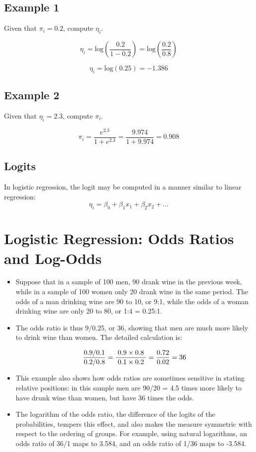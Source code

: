 \documentclass[12pt, a4paper]{article}
\theoremstyle{plain}
\theoremstyle{definition}
\theoremstyle{remark}
\begin{document}
\subsection*{Example 1}
Given that $\pi_i = 0.2$, compute $\eta_i$.

\[ \eta_i = \mbox{log}\left( \frac{0.2}{1-0.2} \right)= \mbox{log}\left( \frac{0.2}{0.8} \right)\] 

\[ \eta_i =  \mbox{log}(0.25) =-1.386 \]

\subsection*{Example 2}
Given that $\eta_i = 2.3$, compute $\pi_i$.

\[ \pi_i  =  \frac{e^{2.3}}{1 + e^{2.3}} = \frac{9.974}{1 + 9.974} = 0.908 \]


\subsection*{Logits}
In logistic regression, the logit may be computed in a manner similar to linear regression:
\[ \eta_i = \beta_0 + \beta_1x_1 + \beta_2x_2 + \ldots  \]


\section{Logistic Regression: Odds Ratios and Log-Odds}
\begin{itemize}
	\item Suppose that in a sample of 100 men, 90 drank wine in the previous week, while in a sample of 100 women only 20 drank wine in the same period. The odds of a man drinking wine are 90 to 10, or 9:1, while the odds of a woman drinking wine are only 20 to 80, or 1:4 = 0.25:1. 
	\item The odds ratio is thus 9/0.25, or 36, showing that men are much more likely to drink wine than women. The detailed calculation is:
	
	\[ { 0.9/0.1 \over 0.2/0.8}=\frac{\;0.9\times 0.8\;}{\;0.1\times 0.2\;} ={0.72 \over 0.02} = 36 \]
	
	\item This example also shows how odds ratios are sometimes sensitive in stating relative positions: in this sample men are 90/20 = 4.5 times more likely to have drunk wine than women, but have 36 times the odds. 
	
	
	\item The logarithm of the odds ratio, the difference of the logits of the probabilities, tempers this effect, and also makes the measure symmetric with respect to the ordering of groups. For example, using natural logarithms, an odds ratio of 36/1 maps to 3.584, and an odds ratio of 1/36 maps to -3.584.
\end{itemize}
\end{document}
